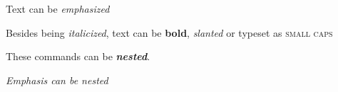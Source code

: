 \documentclass{article}
\begin{document}
{\sffamily
	Text can be {\em emphasized}
	
	Besides being {\itshape italicized},
	text can be {\bfseries bold}, {\slshape slanted} or typeset as {\scshape small caps}

	These commands can be {\itshape \bfseries nested}.
}
	{\em Emphasis can be {\em nested}}
\end{document}

